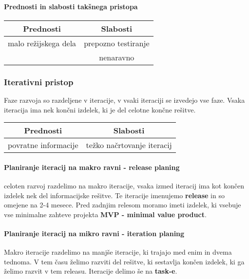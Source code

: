 \documentclass[a4paper,12pt]{report}
\begin{document}
   \paragraph{Prednosti in slabosti takšnega pristopa}\mbox{}
   \begin{center}
      \begin{tabular}{|c||c|}
         \hline
         \textbf{Prednosti} & \textbf{Slabosti}\\
         \hline
         malo režijskega dela & prepozno testiranje\\
         & nenaravno\\
         \hline
      \end{tabular}
   \end{center}

   \subsubsection{Iterativni pristop}
   Faze razvoja so razdeljene v iteracije, v vsaki iteraciji se izvedejo vse faze. Vsaka iteracija ima nek končni izdelek, ki je del celotne končne rešitve.

   \begin{center}
      \begin{tabular}{|c||c|}
         \hline
         \textbf{Prednosti} & \textbf{Slabosti}\\
         \hline
         povratne informacije & težko načrtovanje iteracij\\
         \hline
      \end{tabular}
   \end{center}

   \paragraph{Planiranje iteracij na makro ravni - release planing} celoten razvoj razdelimo na makro iteracije, vsaka izmed iteracij ima kot končen izdelek nek del informacijske rešitve.
   Te iteracije imenujemo \textbf{release} in so omejene na 2-4 mesece. Pred zadnjim relesom moramo imeti izdelek, ki vsebuje vse minimalne zahteve projekta
   \textbf{MVP - minimal value product}.

   \paragraph{Planiranje iteracij na mikro ravni - iteration planing} Makro iteracije razdelimo na manjše iteracije, ki trajajo med enim in dvema tednoma.
   V tem času želimo razviti del rešitve, ki sestavlja končen izdelek, ki ga želimo razvit v tem releasu. Iteracije delimo še na \textbf{task-e}.
\end{document}
